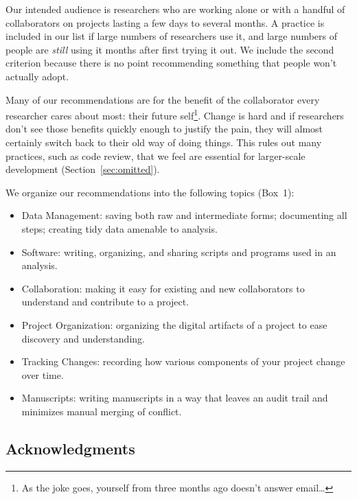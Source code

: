 \documentclass[10pt,letterpaper]{article}
\begin{document}
Our intended audience is researchers who are working alone or with a
handful of collaborators on projects lasting a few days to several
months. A practice is included in our list if large numbers of
researchers use it, and large numbers of people are \emph{still} using
it months after first trying it out. We include the second criterion
because there is no point recommending something that people won't
actually adopt.

Many of our recommendations are for the benefit of the collaborator
every researcher cares about most: their future self\footnote{As the
joke goes, yourself from three months ago doesn't answer
email{\ldots}}. Change is hard and if researchers don't see those
benefits quickly enough to justify the pain, they will almost
certainly switch back to their old way of doing things.  This rules
out many practices, such as code review, that we feel are essential
for larger-scale development (Section~\ref{sec:omitted}).

We organize our recommendations into the following topics (Box~1):

\begin{itemize}

\item Data Management:
  saving both raw and intermediate forms; documenting all steps;
  creating tidy data amenable to analysis.

\item Software:
  writing, organizing, and sharing scripts and programs used in an
  analysis.

\item Collaboration:
  making it easy for existing and new collaborators to understand and
  contribute to a project.

\item Project Organization:
  organizing the digital artifacts of a project to ease discovery and
  understanding.

\item Tracking Changes:
  recording how various components of your project change over time.

\item Manuscripts:
  writing manuscripts in a way that leaves an audit trail and
  minimizes manual merging of conflict.

\end{itemize}

\subsection*{Acknowledgments}
\end{document}

